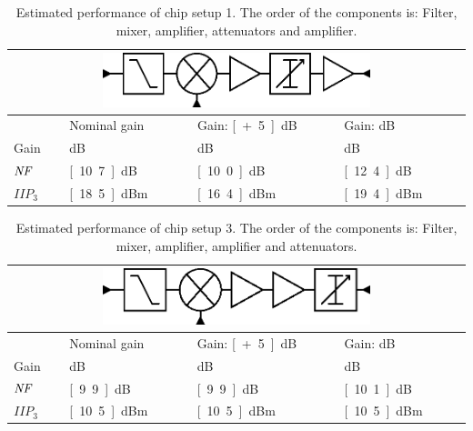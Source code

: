 		\begin{table}[hpt!]
			\caption[Estimated performance of chip setup 1.]{Estimated performance of chip setup 1. The order of the components is: Filter, mixer, amplifier, attenuators and amplifier.}
			\label{tab:confper1}
			\centering
			\begin{tabular}{ l l l l }
				\multicolumn{4}{c}{\includegraphics[width=0.6\textwidth]{fig/system/sys1}} \\\toprule
				& Nominal gain & Gain: \unit[+5]{dB} & Gain: \unit[-5]{dB} \\\midrule
				Gain & \unit[9]{dB} & \unit[14]{dB} & \unit[4]{dB} \\
				$\emph{NF}$ & \unit[10.7]{dB} & \unit[10.0]{dB} & \unit[12.4]{dB} \\
				$IIP_3$ & \unit[18.5]{dBm} & \unit[16.4]{dBm} & \unit[19.4]{dBm} \\\bottomrule
			\end{tabular}
		\end{table}
		
		\begin{table}[hpt!]
			\caption[Estimated performance of chip setup 3.]{Estimated performance of chip setup 3. The order of the components is: Filter, mixer, amplifier, amplifier and attenuators.}
			\label{tab:confper3}
			\centering
			\begin{tabular}{ l l l l }
				\multicolumn{4}{c}{\includegraphics[width=0.6\textwidth]{fig/system/sys3}} \\\toprule
				& Nominal gain & Gain: \unit[+5]{dB} & Gain: \unit[-5]{dB} \\\midrule
				Gain & \unit[9]{dB} & \unit[14]{dB} & \unit[4]{dB} \\
				$\emph{NF}$ & \unit[9.9]{dB} & \unit[9.9]{dB} & \unit[10.1]{dB} \\
				$IIP_3$ & \unit[10.5]{dBm} & \unit[10.5]{dBm} & \unit[10.5]{dBm} \\\bottomrule
			\end{tabular}
		\end{table}

